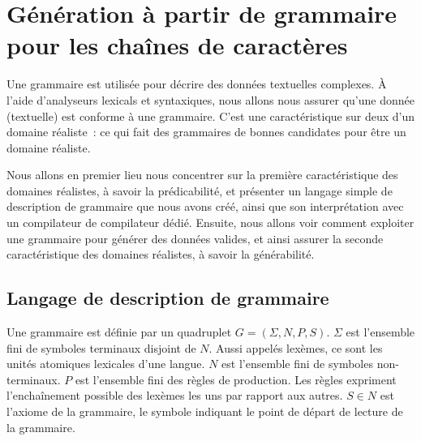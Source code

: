 \section{Génération à partir de grammaire pour les chaînes de caractères}
\label{section:data:strings}

Une grammaire est utilisée pour décrire des données textuelles complexes. À
l'aide d'analyseurs lexicals et syntaxiques, nous allons nous assurer qu'une
donnée (textuelle) est conforme à une grammaire. C'est une caractéristique sur
deux d'un domaine réaliste~: ce qui fait des grammaires de bonnes candidates
pour être un domaine réaliste.

Nous allons en premier lieu nous concentrer sur la première caractéristique des
domaines réalistes, à savoir la prédicabilité, et présenter un langage simple de
description de grammaire que nous avons créé, ainsi que son interprétation avec
un compilateur de compilateur dédié. Ensuite, nous allons voir comment exploiter
une grammaire pour générer des données valides, et ainsi assurer la seconde
caractéristique des domaines réalistes, à savoir la générabilité.

\subsection{Langage de description de grammaire}
\label{subsection:data:pp}

\begin{definition}[Grammaire]

Une grammaire est définie par un quadruplet $G = (\Sigma, N, P, S)$. $\Sigma$
est l'ensemble fini de {\strong symboles terminaux} disjoint de $N$. Aussi
appelés {\strong lexèmes}, ce sont les unités atomiques lexicales d'une langue.
$N$ est l'ensemble fini de {\strong symboles non-terminaux}. $P$ est l'ensemble
fini des {\strong règles de production}. Les règles expriment l'enchaînement
possible des lexèmes les uns par rapport aux autres.  $S \in N$ est l'axiome de
la grammaire, le symbole indiquant le point de départ de lecture de la
grammaire.

\end{definition}

